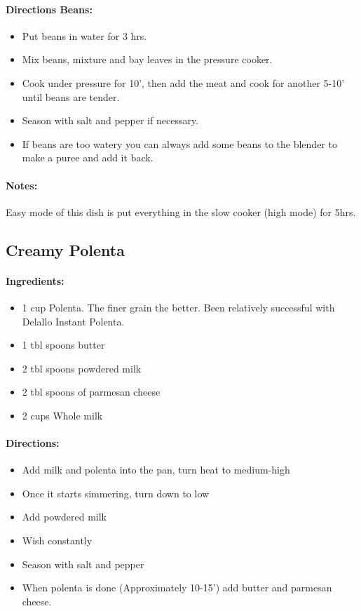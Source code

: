 \documentclass{article}
\begin{document}
\paragraph{Directions Beans:}
\begin{itemize}
	\item Put beans in water for 3 hrs.
	\item Mix beans, mixture and bay leaves in the pressure cooker.
	\item Cook under pressure for 10', then add the meat and cook for another 5-10' until beans are tender.
	\item Season with salt and pepper if necessary.
	\item If beans are too watery you can always add some beans to the blender to make a puree and add it back.
\end{itemize}

\paragraph{Notes:}
Easy mode of this dish is put everything in the slow cooker (high mode) for 5hrs.

\subsection{Creamy Polenta}

\paragraph{Ingredients:}

\begin{itemize}
	\item 1 cup Polenta. The finer grain the better. Been relatively successful with Delallo Instant Polenta.
	\item 1 tbl spoons butter
	\item 2 tbl spoons powdered milk
	\item 2 tbl spoons of parmesan cheese
	\item 2 cups Whole milk
\end{itemize}

\paragraph{Directions:}
\begin{itemize}
	\item Add milk and polenta into the pan, turn heat to medium-high
	\item Once it starts simmering, turn down to low
	\item Add powdered milk
	\item Wish constantly
	\item Season with salt and pepper
	\item When polenta is done (Approximately 10-15’) add butter and parmesan cheese.
\end{itemize}
\end{document}
